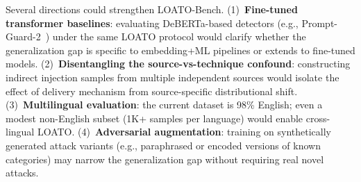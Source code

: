 \documentclass[conference]{IEEEtran}
\begin{document}
Several directions could strengthen LOATO-Bench. (1)~\textbf{Fine-tuned
transformer baselines}: evaluating DeBERTa-based detectors (e.g.,
Prompt-Guard-2~\cite{meta2024promptguard}) under the same LOATO protocol would
clarify whether the generalization gap is specific to embedding+ML pipelines
or extends to fine-tuned models. (2)~\textbf{Disentangling the
source-vs-technique confound}: constructing indirect injection samples from
multiple independent sources would isolate the effect of delivery mechanism
from source-specific distributional shift. (3)~\textbf{Multilingual
evaluation}: the current dataset is 98\% English; even a modest non-English
subset (1K+ samples per language) would enable cross-lingual LOATO.
(4)~\textbf{Adversarial augmentation}: training on synthetically generated
attack variants (e.g., paraphrased or encoded versions of known categories)
may narrow the generalization gap without requiring real novel attacks.
\end{document}
